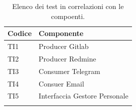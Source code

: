 	\begin{table}[H]
		\centering
		{\def\arraystretch{1.4}
		\begin{tabularx}{\textwidth}{YY}
			\textbf{Codice} & \textbf{Componente} \\
			\toprule
			TI1 & Producer Gitlab \\
			TI2 & Producer Redmine \\
			TI3 & Consumer Telegram \\
			TI4 & Consuer Email \\
			TI5 & Interfaccia Gestore Personale \\
			\bottomrule\\
		\end{tabularx}}
		\caption{Elenco dei test in correlazioni con le compoenti.}
	\end{table}
